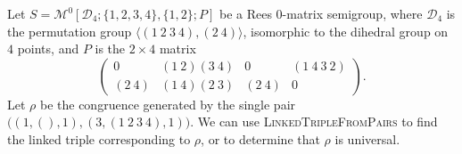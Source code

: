\begin{example}
  \label{ex:pairs-to-linked-triple-4x2}
  Let $S = \mathcal{M}^0[\mathcal{D}_4; \{1,2,3,4\}, \{1,2\}; P]$ be a Rees
  0-matrix semigroup, where $\mathcal{D}_4$ is the permutation group
  $\langle (1~2~3~4), (2~4) \rangle$, isomorphic to the dihedral group on $4$
  points, and $P$ is the $2 \times 4$ matrix
  $$
  \begin{pmatrix}
    0 & (1~2)(3~4) & 0 & (1~4~3~2) \\
    (2~4) & (1~4)(2~3) & (2~4) & 0
  \end{pmatrix}.
  $$
  Let $\rho$ be the congruence generated by the single pair
  $\big(\left(1, (), 1\right), \left(3, (1~2~3~4), 1\right)\big)$.  We can
  use \textsc{LinkedTripleFromPairs} to find the linked triple corresponding to
  $\rho$, or to determine that $\rho$ is universal.


\end{example}
